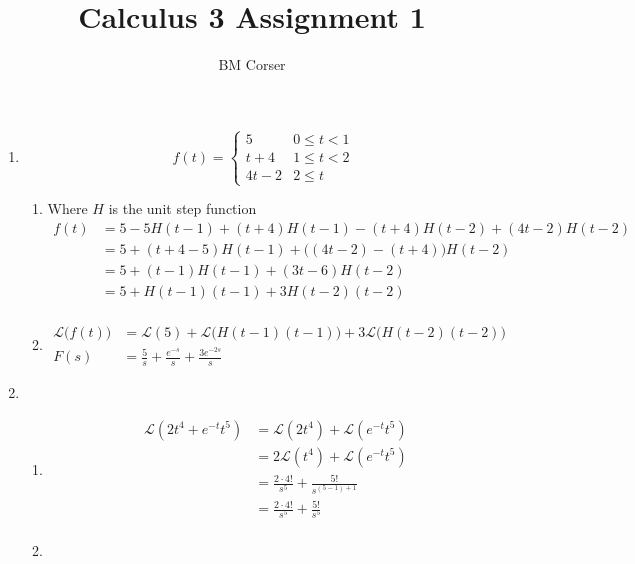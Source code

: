 \documentclass[10pt]{article}
\author{BM Corser}
\title{Calculus 3 Assignment 1}
\newcommand*{\La}{\mathcal{L}}
\begin{document}
  \maketitle 
  \begin{enumerate}
    \item
      $$
        f(t) =
        \begin{cases}
          5 & 0 \le t < 1 \\
          t + 4 & 1 \le t < 2 \\
          4t - 2 & 2 \le t
        \end{cases}
      $$
    \begin{enumerate}
      \item Where $H$ is the unit step function
        \begin{align*}
          f(t) &= 5 - 5H(t - 1) + (t + 4)H(t - 1) - (t + 4)H(t - 2) + (4t - 2)H(t - 2) \\
               &= 5 + (t + 4 - 5)H(t - 1) + \Big((4t - 2) - (t + 4)\Big)H(t - 2) \\
               &= 5 + (t - 1)H(t - 1) + (3t - 6)H(t - 2) \\
               &= 5 + H(t - 1)(t - 1) + 3H(t - 2)(t - 2) \\
        \end{align*}
      \item
        \begin{align*}
          \La\Big(f(t)\Big) &= \La(5) + \La\Big(H(t - 1)(t - 1)\Big) + 3\La\Big(H(t - 2)(t - 2)\Big) \\
            F(s) &= \frac{5}{s} + \frac{e^{-s}}{s} + \frac{3e^{-2s}}{s}
        \end{align*}
    \end{enumerate}
    \item
      \begin{enumerate}
        \item
          \begin{align*}
            \La(2t^4 + e^{-t}t^5) &= \La(2t^4) + \La(e^{-t}t^5) \\
            &= 2\La(t^4) + \La(e^{-t}t^5) \\
            &= \frac{2 \cdot 4!}{s^5} + \frac{5!}{s^{(5 - 1) + 1}} \\
            &= \frac{2 \cdot 4!}{s^5} + \frac{5!}{s^5} \\
          \end{align*}
        \item
          \begin{align*}

\end{align*}
\end{enumerate}
\end{enumerate}
\end{document}
